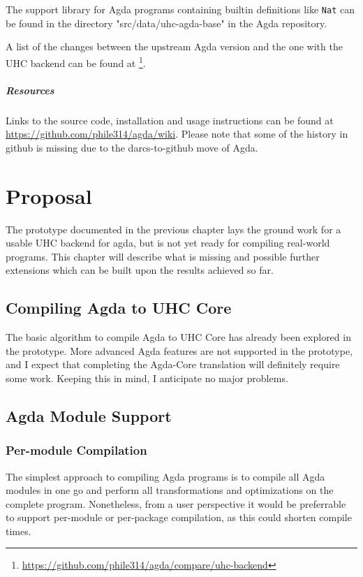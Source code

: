 \documentclass[12pt, a4paper, twoside]{report}
\begin{document}
The support library for Agda programs containing builtin definitions like \texttt{Nat} can
be found in the directory "src/data/uhc-agda-base" in the Agda repository.


A list of the changes between the upstream Agda version and the one with the UHC backend can be found at \footnote{\url{https://github.com/phile314/agda/compare/uhc-backend}}.

\paragraph{Resources}
Links to the source code, installation and usage instructions can be found
at \url{https://github.com/phile314/agda/wiki}. Please note that some of the
history in github is missing due to the darcs-to-github move of Agda.

\chapter{Proposal}
\label{chp:proposal}

The prototype documented in the previous chapter lays the ground work for a usable UHC backend
for agda, but is not yet ready for compiling real-world programs. This chapter will
describe what is missing and possible further extensions which can be built upon the results
achieved so far.

\section{Compiling Agda to UHC Core}
The basic algorithm to compile Agda to UHC Core has already been explored in the prototype. More
advanced Agda features are not supported in the prototype, and I expect that completing the
Agda-Core translation will definitely require some work. Keeping this in mind,
I anticipate no major problems.

\section{Agda Module Support}
\subsection{Per-module Compilation}
The simplest approach to compiling Agda programs is to compile all Agda modules in one go
and perform all transformations and optimizations on the complete program. Nonetheless, from
a user perspective it would be preferrable to support per-module or per-package compilation,
as this could shorten compile times.
\end{document}
